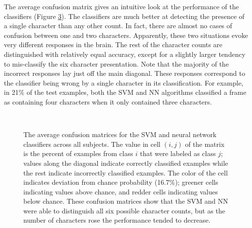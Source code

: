 \documentclass[5p,authoryear]{elsarticle}
\begin{document}
The average confusion matrix gives an intuitive look at the performance of the classifiers (Figure \ref{fig:average-confusion}).
The classifiers are much better at detecting the presence of a single character than any other count.
In fact, there are almost no cases of confusion between one and two characters.
Apparently, these two situations evoke very different responses in the brain.
The rest of the character counts are distinguished with relatively equal accuracy,
except for a slightly larger tendency to mis-classify the six character presentation.
Note that the majority of the incorrect responses lay just off the main diagonal.
These responses correspond to the classifier being wrong by a single character in its classification.
For example, in 21\% of the test examples, both the SVM and NN algorithms classified a frame as containing four characters when it only contained three characters.

\begin{figure}
\centering
\begin{subfigure}{0.3\textwidth}
\centering
\begin{adjustbox}{center}

\end{adjustbox}
\caption{}
\label{fig:average-confusion-svm}
\end{subfigure}
\\
\begin{subfigure}{0.3\textwidth}
\centering
\begin{adjustbox}{center}

\end{adjustbox}
\caption{}
\label{fig:average-confusion-nn}
\end{subfigure}
\caption{The average confusion matrices for the  SVM and  neural network classifiers across all subjects.
The value in cell $(i,j)$ of the matrix is the percent of examples from class $i$ that were labeled as class $j$; values along the diagonal indicate correctly classified examples while the rest indicate incorrectly classified examples.
The color of the cell indicates deviation from chance probability (16.7\%);
greener cells indicating values above chance, and redder cells indicating values below chance.
These confusion matrices show that the SVM and NN were able to distinguish all six possible character counts, but as the number of characters rose the performance tended to decrease.}
\label{fig:average-confusion}
\end{figure}
\end{document}
